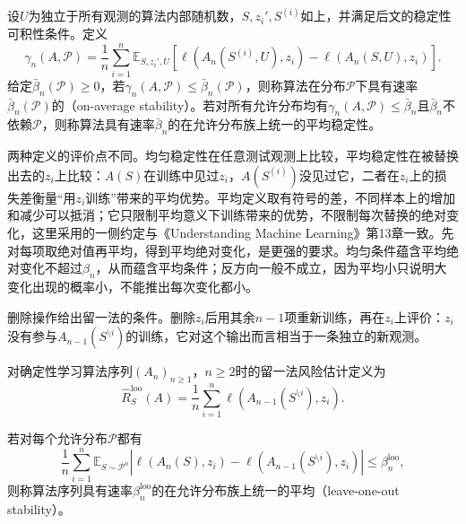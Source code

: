 \begin{definition}[平均稳定性]
\label{def:on-average-stability}
设$U$为独立于所有观测的算法内部随机数，$S,z_i',S^{(i)}$如上，并满足后文的稳定性可积性条件。定义
\begin{equation}
 \gamma_n(A,\mathcal P)
 =\frac1n\sum_{i=1}^n\mathbb E_{S,z_i',U}
 \left[\ell(A_n(S^{(i)},U),z_i)-\ell(A_n(S,U),z_i)\right].
 \label{eq:on-average-stability}
\end{equation}
给定$\bar\beta_n(\mathcal P)\geq0$，若$\gamma_n(A,\mathcal P)\leq\bar\beta_n(\mathcal P)$，则称算法在分布$\mathcal P$下具有速率$\bar\beta_n(\mathcal P)$的（on-average stability）。若对所有允许分布均有$\gamma_n(A,\mathcal P)\leq\bar\beta_n$且$\bar\beta_n$不依赖$\mathcal P$，则称算法具有速率$\bar\beta_n$的在允许分布族上统一的平均稳定性。
\end{definition}

两种定义的评价点不同。均匀稳定性在任意测试观测上比较，平均稳定性在被替换出去的$z_i$上比较：$A(S)$在训练中见过$z_i$，$A(S^{(i)})$没见过它，二者在$z_i$上的损失差衡量“用$z_i$训练”带来的平均优势。平均定义取有符号的差，不同样本上的增加和减少可以抵消；它只限制平均意义下训练带来的优势，不限制每次替换的绝对变化，这里采用的一侧约定与《Understanding Machine Learning》第13章一致。先对每项取绝对值再平均，得到平均绝对变化，是更强的要求。均匀条件蕴含平均绝对变化不超过$\beta_n$，从而蕴含平均条件；反方向一般不成立，因为平均小只说明大变化出现的概率小，不能推出每次变化都小。

删除操作给出留一法的条件。删除$z_i$后用其余$n-1$项重新训练，再在$z_i$上评价：$z_i$没有参与$A_{n-1}(S^{\setminus i})$的训练，它对这个输出而言相当于一条独立的新观测。

\begin{definition}[留一法风险估计]
\label{def:loo-risk}
对确定性学习算法序列$(A_n)_{n\geq1}$，$n\geq2$时的留一法风险估计定义为
\[
 \hat R_S^{\mathrm{loo}}(A)=\frac1n\sum_{i=1}^n\ell(A_{n-1}(S^{\setminus i}),z_i).
\]
\end{definition}

\begin{definition}[平均留一法稳定性]
\label{def:loo-stability}
若对每个允许分布$\mathcal P$都有
\[
 \frac1n\sum_{i=1}^n\mathbb E_{S\sim\mathcal P^n}
 \left|\ell(A_n(S),z_i)-\ell(A_{n-1}(S^{\setminus i}),z_i)\right|
 \leq\beta_n^{\mathrm{loo}},
\]
则称算法序列具有速率$\beta_n^{\mathrm{loo}}$的在允许分布族上统一的平均（leave-one-out stability）。
\end{definition}

